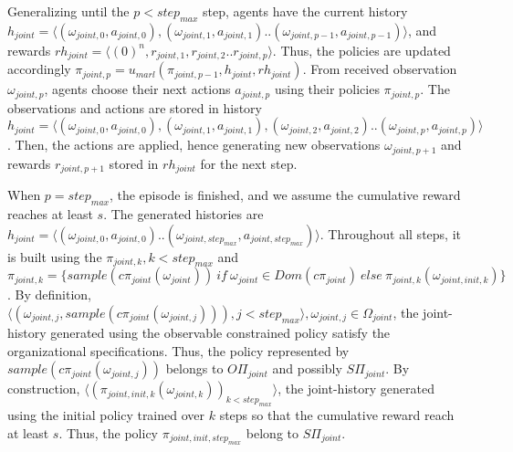 \begin{proofoutline}


    Generalizing until the $p < step_{max}$ step, agents have the current history $h_{joint} = \langle (\omega_{joint,0}, \allowbreak a_{joint,0}), (\omega_{joint,1}, a_{joint,1})..(\omega_{joint,p-1}, a_{joint,p-1}) \rangle$, and rewards $rh_{joint} = \langle (0)^n, r_{joint,1}, r_{joint,2}..r_{joint,p} \rangle$. Thus, the policies are updated accordingly $\pi_{joint,p} = u_{marl}(\pi_{joint,p-1},h_{joint},rh_{joint})$. From received observation $\omega_{joint,p}$, agents choose their next actions $a_{joint,p}$ using their policies $\pi_{joint,p}$. The observations and actions are stored in history $h_{joint} \allowbreak = \allowbreak \langle \allowbreak (\omega_{joint,0},a_{joint,0}), \allowbreak (\omega_{joint,1},a_{joint,1}), (\omega_{joint,2},a_{joint,2})..(\omega_{joint,p},a_{joint,p}) \rangle$. Then, the actions are applied, hence generating new observations $\omega_{joint,p+1}$ and rewards $r_{joint,p+1}$ stored in $rh_{joint}$ for the next step.

    When $p = step_{max}$, the episode is finished, and we assume the cumulative reward reaches at least $s$. The generated histories are $h_{joint} = \langle (\omega_{joint,0}, \allowbreak a_{joint,0}) .. \allowbreak (\omega_{joint,step_{max}},a_{joint,step_{max}}) \rangle$. Throughout all steps, it is built using the $\pi_{joint,k}, \allowbreak k < step_{max}$ and $\pi_{joint,k} \allowbreak = \allowbreak \{sample(c\pi_{joint}(\omega_{joint})) \allowbreak \ \allowbreak if \allowbreak \ \allowbreak \omega_{joint} \in Dom(c\pi_{joint}) \allowbreak \ \allowbreak else \allowbreak \ \allowbreak \pi_{joint,k}(\omega_{joint,init,k})\}$.
    By definition, $\langle (\omega_{joint,j}, \allowbreak sample(c\pi_{joint}(\omega_{joint,j}))), \allowbreak j < step_{max} \rangle, \allowbreak \omega_{joint,j} \allowbreak \in \Omega_{joint}$, the joint-history generated using the observable constrained policy satisfy the organizational specifications. Thus, the policy represented by $sample(c\pi_{joint}(\omega_{joint,j}))$ belongs to $O\Pi_{joint}$ and possibly $S\Pi_{joint}$.
    By construction, $\langle (\pi_{joint,init,k}(\omega_{joint,k}))_{k < step_{max}} \rangle$, the joint-history generated using the initial policy trained over $k$ steps so that the cumulative reward reach at least $s$. Thus, the policy $\pi_{joint,init,step_{max}}$ belong to $S\Pi_{joint}$.


\end{proofoutline}
